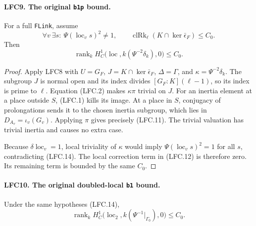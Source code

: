 \paragraph{LFC9. The original \texttt{b1p} bound.}
\label{claim:LFC9}
For a full \texttt{FLink}, assume
\[
 \forall v\ \exists s:\ \Psi(\operatorname{loc}_v s)^2\ne1,
 \qquad
 \operatorname{clRk}_\ell
       (K\cap\ker\bar\epsilon_F)\le C_0.                 \tag{LFC.14}
\]
Then
\[
 \operatorname{rank}_k
 H^1_C\bigl(\operatorname{loc},
               k(\Psi^{-2}\delta_k),0\bigr)\le C_0.
                                                        \tag{LFC.15}
\]

\begin{proof}
Apply LFC8 with \(U=G_F\),
\(J=K\cap\ker\bar\epsilon_F\), \(\Delta=\Gamma\), and
\(\kappa=\Psi^{-2}\delta_k\).
The subgroup \(J\) is normal open and its index divides
\([G_F:K](\ell-1)\), so its index is prime to \(\ell\).
Equation (LFC.2) makes \(\kappa\pi\) trivial on \(J\).
For an inertia element at a place outside \(S\), (LFC.1)
kills its image.  At a place in \(S\), conjugacy of
prolongations sends it to the chosen inertia subgroup,
which lies in \(D_{A_v}=\iota_v(G_v)\).  Applying \(\pi\)
gives precisely (LFC.11).
The trivial valuation has trivial inertia and causes
no extra case.

Because \(\delta\operatorname{loc}_v=1\), local triviality
of \(\kappa\) would imply
\(\Psi(\operatorname{loc}_v s)^2=1\) for all \(s\),
contradicting (LFC.14).
The local correction term in (LFC.12) is therefore zero.
Its remaining term is bounded by the same \(C_0\).
\end{proof}

\paragraph{LFC10. The original doubled-local \texttt{b1} bound.}
\label{claim:LFC10}
Under the same hypotheses (LFC.14),
\[
 \operatorname{rank}_k H^1_C
   \bigl(\operatorname{loc}_2,
         k(\Psi^{-1}|_{\Gamma_0}),0\bigr)\le C_0.
                                                        \tag{LFC.16}
\]

